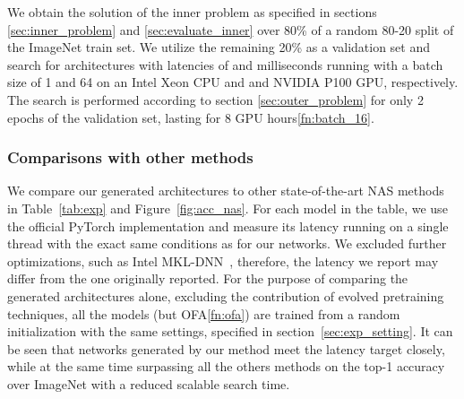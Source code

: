 \documentclass[dvipsnames,table,xcdraw]{article}
\begin{document}
We obtain the solution of the inner problem  as specified in sections \ref{sec:inner_problem} and \ref{sec:evaluate_inner} over 80\% of a random 80-20 split of the ImageNet train set. We utilize the remaining 20\% as a validation set and search for architectures with latencies of  and  milliseconds running with a batch size of 1 and 64 on an Intel Xeon CPU and and NVIDIA P100 GPU, respectively. The search is performed according to section \ref{sec:outer_problem} for only 2 epochs of the validation set, lasting for 8 GPU hours\cref{fn:batch_16}. 
\vspace{-0.2em}
\subsubsection{Comparisons with other methods}\label{sec:exp_comparison}
\vspace{-0.2em}
We compare our generated architectures to other state-of-the-art NAS methods in Table~\ref{tab:exp} and Figure~\ref{fig:acc_nas}. 
For each model in the table, we use the official PyTorch implementation \cite{pytorch} and measure its latency running on a single thread with the exact same conditions as for our networks. We excluded further optimizations, such as Intel MKL-DNN~\cite{mkl_dnn}, therefore, the latency we report may differ from the one originally reported. 
For the purpose of comparing the generated architectures alone, excluding the contribution of evolved pretraining techniques, all the models (but OFA\cref{fn:ofa}) are trained from a random initialization with the same settings, specified in section~\ref{sec:exp_setting}. 
It can be seen that networks generated by our method meet the latency target closely, while at the same time surpassing all the others methods on the top-1 accuracy over ImageNet with a reduced scalable search time. 
\end{document}
